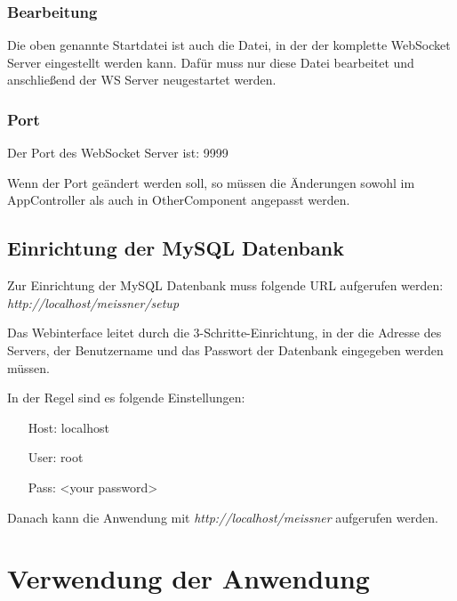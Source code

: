 \subsection{Bearbeitung}
Die oben genannte Startdatei ist auch die Datei, in der der komplette WebSocket Server eingestellt werden kann. Dafür muss nur diese Datei bearbeitet und anschließend der WS Server neugestartet werden.

\subsection{Port}
Der Port des WebSocket Server ist: 9999\par

Wenn der Port geändert werden soll, so müssen die Änderungen sowohl im AppController als auch in OtherComponent angepasst werden.


\section{Einrichtung der MySQL Datenbank}
Zur Einrichtung der MySQL Datenbank muss folgende URL aufgerufen werden:\\
\emph{http://localhost/meissner/setup}\par

Das Webinterface leitet durch die 3-Schritte-Einrichtung, in der die Adresse des Servers, der Benutzername und das Passwort der Datenbank eingegeben werden müssen.\par

In der Regel sind es folgende Einstellungen:

\begin{itemize}
	\item[Host:] localhost
	\item[User:] root
	\item[Pass:] <your password>
\end{itemize}

Danach kann die Anwendung mit \emph{http://localhost/meissner} aufgerufen werden.


\chapter{Verwendung der Anwendung}
